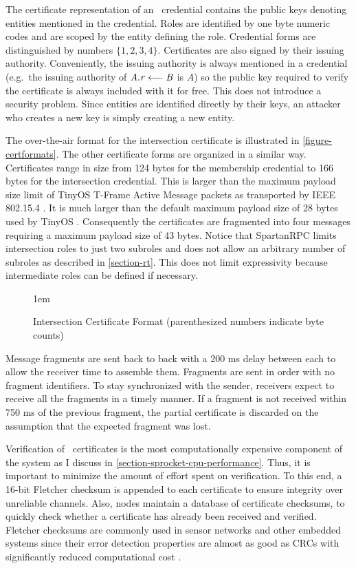 The certificate representation of an \RT\ credential contains the public keys denoting entities
mentioned in the credential. Roles are identified by one byte numeric codes and are scoped by
the entity defining the role. Credential forms are distinguished by numbers $\{ 1, 2, 3, 4 \}$.
Certificates are also signed by their issuing authority. Conveniently, the issuing authority is
always mentioned in a credential (e.g.~the issuing authority of $\mathit{A.r} \stackrel{}{\longleftarrow} \mathit{B}$ is $A$) so the
public key required to verify the certificate is always included with it for free. This does not
introduce a security problem. Since entities are identified directly by their keys, an attacker
who creates a new key is simply creating a new entity.

The over-the-air format for the intersection certificate is illustrated in
\autoref{figure-certformats}. The other certificate forms are organized in a similar way.
Certificates range in size from 124 bytes for the membership credential to 166 bytes for the
intersection credential. This is larger than the maximum payload size limit of TinyOS T-Frame
Active Message packets as transported by IEEE 802.15.4 \cite{802.15.4,hui-tep125}. It is much
larger than the default maximum payload size of 28 bytes used by TinyOS \cite{levis-tep111}.
Consequently the certificates are fragmented into four messages requiring a maximum payload size
of 43 bytes. Notice that SpartanRPC limits intersection roles to just two subroles and does not
allow an arbitrary number of subroles as described in \autoref{section-rt}. This does not limit
expressivity because intermediate roles can be defined if necessary.

\begin{figure}[t]
  
  \centerline{\raise 1em\box\graph}
  \vspace{2mm}
  \caption{Intersection Certificate Format (parenthesized numbers indicate byte counts)}
  \label{figure-certformats}
\end{figure}

Message fragments are sent back to back with a 200 ms delay between each to allow the receiver
time to assemble them. Fragments are sent in order with no fragment identifiers. To stay
synchronized with the sender, receivers expect to receive all the fragments in a timely manner.
If a fragment is not received within 750 ms of the previous fragment, the partial certificate is
discarded on the assumption that the expected fragment was lost.

Verification of \RT\ certificates is the most computationally expensive component of the system
as I discuss in \autoref{section-sprocket-cpu-performance}. Thus, it is important to minimize
the amount of effort spent on verification. To this end, a 16-bit Fletcher checksum is appended
to each certificate to ensure integrity over unreliable channels. Also, nodes maintain a
database of certificate checksums, to quickly check whether a certificate has already been
received and verified. Fletcher checksums are commonly used in sensor networks and other
embedded systems since their error detection properties are almost as good as CRCs with
significantly reduced computational cost \cite{fletcher-1982}.

